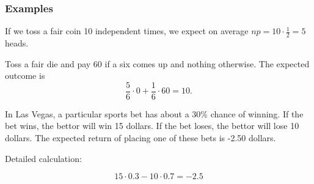 \documentclass[12pt,a4paper]{article}
\theoremstyle{regla}
\theoremstyle{remark}
\theoremstyle{definition}
\theoremstyle{nonumberbreak}
\begin{document}
\subsubsection{Examples}
\begin{xmpl}
 If we toss a fair coin 10 independent times, we expect on average $np=10\cdot\frac{1}{2}= 5$ heads.
\end{xmpl}
\begin{xmpl}
Toss a fair die and pay $60$ if a six comes up and nothing otherwise. The expected outcome is
$$
\frac{5}{6}\cdot 0+\frac{1}{6}\cdot 60=  10.
$$
\end{xmpl}
\begin{xmpl}

In Las Vegas, a particular sports bet has about a 30\% chance of winning. If the bet wins, the bettor will win 15 dollars. If the bet loses, the bettor will lose 10 dollars.
The expected return of placing one of these bets is -2.50 dollars.

Detailed calculation:


$$ 15\cdot 0.3 - 10 \cdot 0.7 = - 2.5$$
\end{xmpl}
\end{document}
